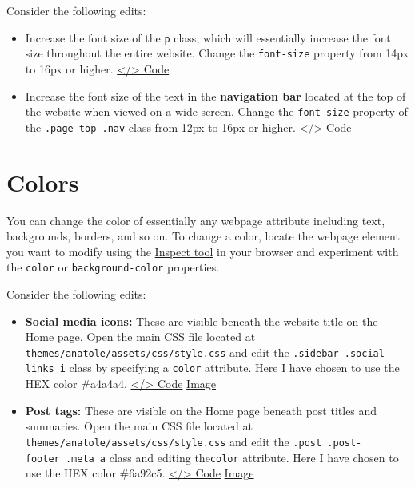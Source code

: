 \documentclass[
]{book}
\begin{document}
Consider the following edits:

\begin{itemize}
\item
  Increase the font size of the \texttt{p} class, which will essentially increase the font size throughout the entire website. Change the \texttt{font-size} property from 14px to 16px or higher. \href{https://github.com/dannymorris/r4sites-anatole-custom/blob/master/themes/anatole/assets/css/style.css\#L55-L59}{\textless/\textgreater{} Code}
\item
  Increase the font size of the text in the \textbf{navigation bar} located at the top of the website when viewed on a wide screen. Change the \texttt{font-size} property of the \texttt{.page-top\ .nav} class from 12px to 16px or higher. \href{https://github.com/dannymorris/r4sites-anatole-custom/blob/master/themes/anatole/assets/css/style.css\#L200-L207}{\textless/\textgreater{} Code}
\end{itemize}

\hypertarget{colors}{%
\section{Colors}\label{colors}}

You can change the color of essentially any webpage attribute including text, backgrounds, borders, and so on. To change a color, locate the webpage element you want to modify using the \protect\hyperlink{inspect-tool}{Inspect tool} in your browser and experiment with the \texttt{color} or \texttt{background-color} properties.

Consider the following edits:

\begin{itemize}
\item
  \textbf{Social media icons:} These are visible beneath the website title on the Home page. Open the main CSS file located at \texttt{themes/anatole/assets/css/style.css} and edit the \texttt{.sidebar\ .social-links\ i} class by specifying a \texttt{color} attribute. Here I have chosen to use the HEX color \#a4a4a4. \href{https://github.com/dannymorris/r4sites-anatole-custom/blob/master/themes/anatole/assets/css/style.css\#L322-L325}{\textless/\textgreater{} Code} \href{https://i.imgur.com/Q7uhdaQ.png}{Image}
\item
  \textbf{Post tags:} These are visible on the Home page beneath post titles and summaries. Open the main CSS file located at \texttt{themes/anatole/assets/css/style.css} and edit the \texttt{.post\ .post-footer\ .meta\ a} class and editing the\texttt{color} attribute. Here I have chosen to use the HEX color \#6a92c5. \href{https://github.com/dannymorris/r4sites-anatole-custom/blob/master/themes/anatole/assets/css/style.css\#L479-L482}{\textless/\textgreater{} Code} \href{https://i.imgur.com/JnueFsN.png}{Image}
\end{itemize}
\end{document}

